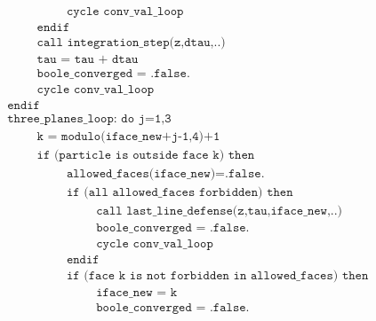 \documentclass[./main.tex]{subfiles}
\begin{document}
\begin{align*}
&\hspace{3cm} \texttt{cycle conv\_val\_loop}\nonumber\\
&\hspace{2cm} \texttt{endif}\nonumber\\
&\hspace{2cm} \texttt{call integration\_step(z,dtau,..)}\nonumber\\
&\hspace{2cm} \texttt{tau = tau + dtau}\nonumber\\
&\hspace{2cm} \texttt{boole\_converged = .false.}\nonumber\\
&\hspace{2cm} \texttt{cycle conv\_val\_loop }\nonumber\\
&\hspace{1cm} \texttt{endif}\nonumber\\
&\hspace{1cm} \texttt{three\_planes\_loop: do j=1,3}\nonumber\\
&\hspace{2cm} \texttt{k = modulo(iface\_new+j-1,4)+1}\nonumber\\
&\hspace{2cm} \texttt{if (particle is outside face k) then}\nonumber\\
&\hspace{3cm} \texttt{allowed\_faces(iface\_new)=.false.}\nonumber\\
&\hspace{3cm} \texttt{if (all allowed\_faces forbidden) then}\nonumber\\
&\hspace{4cm} \texttt{call last\_line\_defense(z,tau,iface\_new,..)}\nonumber\\
&\hspace{4cm} \texttt{boole\_converged = .false.}\nonumber\\
&\hspace{4cm} \texttt{cycle conv\_val\_loop}\nonumber\\
&\hspace{3cm} \texttt{endif}\nonumber\\
&\hspace{3cm} \texttt{if (face k is not forbidden in allowed\_faces) then}\nonumber\\
&\hspace{4cm} \texttt{iface\_new = k}\nonumber\\
&\hspace{4cm} \texttt{boole\_converged = .false.}\nonumber\\

\end{align*}
\end{document}

